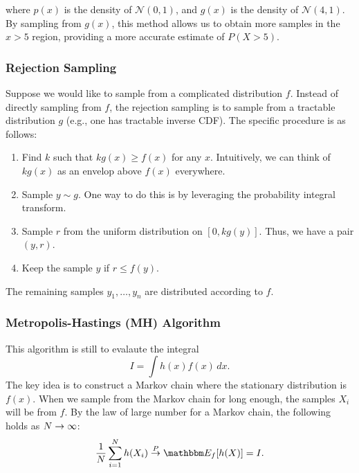         where \( p(x) \) is the density of \( \mathcal{N}(0,1) \), and \( g(x) \) is the density of \( \mathcal{N}(4,1) \). By sampling from \( g(x) \), this method allows us to obtain more samples in the \( x > 5 \) region, providing a more accurate estimate of \( P(X > 5) \).


    \subsubsection{Rejection Sampling}
        Suppose we would like to sample from a complicated distribution $f$.
        Instead of directly sampling from $f$, the rejection sampling is to sample from a tractable distribution $g$ (e.g., one has tractable inverse CDF).
        The specific procedure is as follows:
        \begin{enumerate}
            \item Find $k$ such that $k g(x) \ge f(x)$ for any $x$. Intuitively, we can think of $k g(x)$ as an envelop above $f(x)$ everywhere.
            \item Sample $y \sim g$. One way to do this is by leveraging the probability integral transform.
            \item Sample $r$ from the uniform distribution on $[0, kg(y)]$. Thus, we have a pair $(y, r)$.
            \item Keep the sample $y$ if $r \le f(y)$.
        \end{enumerate}
        The remaining samples $y_1, \ldots, y_n$ are distributed according to $f$.

    \subsubsection{Metropolis-Hastings (MH) Algorithm}
        This algorithm is still to evalaute the integral
            \begin{equation}
                I = \int h(x) f(x) \, d x.
            \end{equation}
        The key idea is to construct a Markov chain where the stationary distribution is $f(x)$.
        When we sample from the Markov chain for long enough, the samples $X_i$ will be from $f$.
        By the law of large number for a Markov chain, the following holds as $N \rightarrow \infty$: 
            \begin{equation}
                \frac{1}{\ndata}\sum_{i=1}^{\ndata}{h(X_i)} \stackrel{P}{\rightarrow} \E_{f}[h(X)] = I.
            \end{equation}

